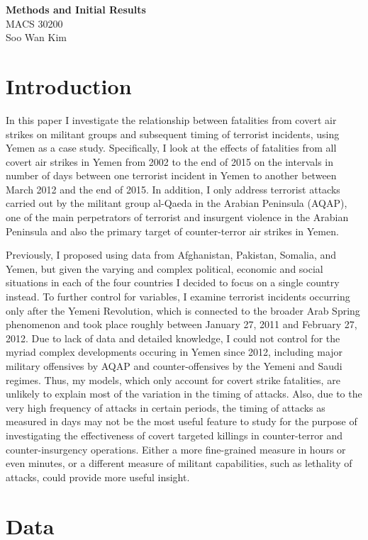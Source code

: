 \documentclass[letterpaper,12pt]{article}
\theoremstyle{definition}
\begin{document}
\begin{flushleft}
  \textbf{\large{Methods and Initial Results}} \\
  MACS 30200\\
  Soo Wan Kim
\end{flushleft}
\section{Introduction}

In this paper I investigate the relationship between fatalities from covert air strikes on militant groups and subsequent timing of terrorist incidents, using Yemen as a case study. Specifically, I look at the effects of fatalities from all covert air strikes in Yemen from 2002 to the end of 2015 on the intervals in number of days between one terrorist incident in Yemen to another between March 2012 and the end of 2015. In addition, I only address terrorist attacks carried out by the militant group al-Qaeda in the Arabian Peninsula (AQAP), one of the main perpetrators of terrorist and insurgent violence in the Arabian Peninsula and also the primary target of counter-terror air strikes in Yemen.

Previously, I proposed using data from Afghanistan, Pakistan, Somalia, and Yemen, but given the varying and complex political, economic and social situations in each of the four countries I decided to focus on a single country instead. To further control for variables, I examine terrorist incidents occurring only after the Yemeni Revolution, which is connected to the broader Arab Spring phenomenon and took place roughly between January 27, 2011 and February 27, 2012. Due to lack of data and detailed knowledge, I could not control for the myriad complex developments occuring in Yemen since 2012, including major military offensives by AQAP and counter-offensives by the Yemeni and Saudi regimes. Thus, my models, which only account for covert strike fatalities, are unlikely to explain most of the variation in the timing of attacks. Also, due to the very high frequency of attacks in certain periods, the timing of attacks as measured in days may not be the most useful feature to study for the purpose of investigating the effectiveness of covert targeted killings in counter-terror and counter-insurgency operations. Either a more fine-grained measure in hours or even minutes, or a different measure of militant capabilities, such as lethality of attacks, could provide more useful insight.

\section{Data}
\end{document}
